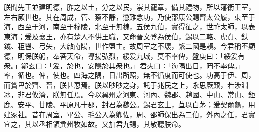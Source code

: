 \begin{pinyinscope}
朕聞先王並建明德，胙之以土，分之以民，崇其寵章，備其禮物，所以藩衞王室，左右厥世也。其在周成，管、蔡不靜，懲難念功，乃使邵康公賜齊太公履，東至于海，西至于河，南至于穆陵，北至于無棣，五侯九伯，實得征之，世祚太師，以表東海；爰及襄王，亦有楚人不供王職，又命晉文登為侯伯，錫以二輅、虎賁、鈇鉞、秬鬯、弓矢，大啟南陽，世作盟主。故周室之不壞，繄二國是賴。今君稱丕顯德，明保朕躬，奉荅天命，導揚弘烈，緩爰九域，莫不率俾，盤庚曰：「綏爰有衆。」鄭玄曰：「爰，於也，安隱於其衆也。」君奭曰：「海隅出日，罔不率俾。」率，循也。俾，使也。四海之隅，日出所照，無不循度而可使也。功高于伊、周，而賞卑於齊、晉，朕甚恧焉。朕以眇眇之身，託于兆民之上，永思厥艱，若涉淵冰，非君攸濟，朕無任焉。今以兾州之河東、河內、魏郡、趙國、中山、常山、鉅鹿、安平、甘陵、平原凡十郡，封君為魏公。錫君玄土，苴以白茅；爰契爾龜，用建冢社。昔在周室，畢公、毛公入為卿佐，周、邵師保出為二伯，外內之任，君實宜之，其以丞相領兾州牧如故。又加君九錫，其敬聽朕命。


\end{pinyinscope}
